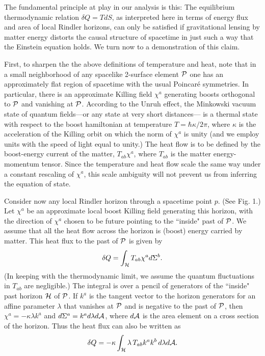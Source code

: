 \documentclass[12pt]{article}
\begin{document}
The fundamental principle at play in our analysis is this:
The equilibrium thermodynamic relation $\delta Q=T dS$,
as interpreted here in terms of energy flux and area of
local Rindler horizons, can only be satisfied if gravitational
lensing by matter energy distorts the causal structure of
spacetime in just such a way that the Einstein equation holds.
We turn now to a demonstration of this claim.

First, to sharpen the the above definitions of temperature and heat,
note that in a small neighborhood of any spacelike 2-surface
element ${\cal P}$ one has an approximately flat
region of spacetime with the usual Poincar\'e symmetries.
In particular, there is an approximate Killing field $\chi^a$
generating boosts orthogonal to ${\cal P}$ and vanishing at ${\cal P}$.
According to the Unruh effect\cite{unruh}, the Minkowski
vacuum state of quantum fields---or any state at very short distances---
is a thermal state with respect to the boost hamiltonian
at temperature $T=\hbar \kappa/2\pi$, where
$\kappa$ is the acceleration of the Killing orbit on which
the norm of $\chi^a$ is unity (and we employ units with the
speed of light equal to unity.) The heat flow is to be defined by the
boost-energy current of the matter, $T_{ab}\chi^a$, where
$T_{ab}$ is the matter energy-momentum tensor.
Since the temperature and heat flow scale the same way under
a constant rescaling of $\chi^a$, this scale ambiguity will
not prevent us from inferring the equation of state.

Consider now any local Rindler horizon through a spacetime point $p$.
(See Fig. 1.)
Let $\chi^a$ be an approximate local boost Killing field
generating this horizon, with the direction of $\chi^a$ chosen to
be future pointing to the ``inside" past of ${\cal P}$. We assume
that all the heat flow across the horizon is (boost) energy
carried by matter. This heat flux to the past of ${\cal P}$ is given by
\begin{equation}
\delta Q=\int_{\cal H} T_{ab}\chi^a d\Sigma^b.
\end{equation}
(In keeping with the thermodynamic limit, we assume
the quantum fluctuations in $T_{ab}$ are negligible.)
The integral is over a pencil of generators of the ``inside"
past horizon ${\cal H}$ of ${\cal P}$.
If $k^a$ is the tangent vector to the horizon generators for
an affine parameter $\lambda$ that vanishes at ${\cal P}$
and is negative to the past of ${\cal P}$, then
$\chi^a=-\kappa\lambda k^a$ and $d\Sigma^a=k^a d\lambda d{\cal A} $,
where $d{\cal A}$ is the area element on a cross section of the
horizon. Thus the heat flux can also be written as
\begin{equation}
\delta Q=-\kappa\int_{\cal H} \lambda \, T_{ab}k^a k^b \,
d\lambda d{\cal A}.
\label{dQ}
\end{equation}
\end{document}
